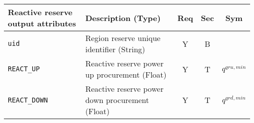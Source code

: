 \documentclass{article}
\newcounter{todo}[section] \setcounter{todo}{0}
\renewcommand{\thetodo}{\arabic{section}.\arabic{todo}}
\newenvironment{todo}[2][]{%
\refstepcounter{todo}%
\ifstrempty{#1}%
{\mdfsetup{%
frametitle={%
\tikz[baseline=(current bounding box.east),outer sep=0pt]
\node[anchor=east,rectangle,fill=red!20]
{\strut To Be Discussed~\thetodo};}}
}%
{\mdfsetup{%
frametitle={%
\tikz[baseline=(current bounding box.east),outer sep=0pt]
\node[anchor=east,rectangle,fill=red!20]
{\strut To Be Discussed~\thetodo:~#1};}}%
}%
\mdfsetup{innertopmargin=10pt,linecolor=red!20,%
linewidth=2pt,topline=true,%
frametitleaboveskip=\dimexpr-\ht\strutbox\relax
}
\begin{mdframed}[]\relax%
\label{#2}}{\end{mdframed}}
\begin{document}
\begin{center}
\small
\begin{tabular}{ l | l | c | c | c |}
Reactive reserve output attributes & Description (Type) & Req & Sec & Sym\\
\hline
  {\tt uid} & Region reserve unique identifier (String) & Y & B & \\
  {\tt REACT\_UP} & Reactive reserve power up procurement (Float) & Y & T & $q^{qru,min}$ \\
  {\tt REACT\_DOWN} & Reactive reserve power down procurement (Float) & Y & T & $q^{qrd,min}$ \\
  \hline
\end{tabular}
\end{center}


\end{document}
